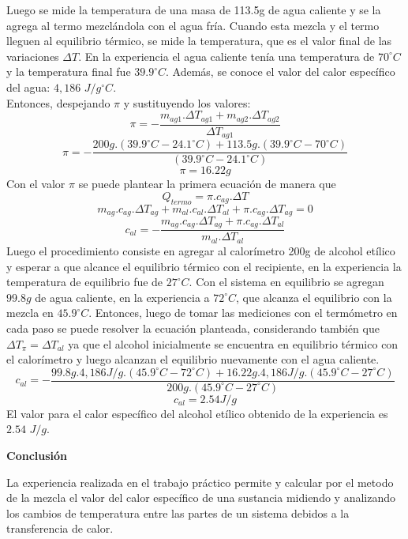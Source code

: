 \documentclass[11pt, letterpaper]{article}
\newcommand\vsp{10pt}
\newcommand\celc{^\circ C}
\begin{document}
Luego se mide la temperatura de una masa de 113.5g de agua caliente y se la agrega al 
termo mezclándola con el agua fría. Cuando esta mezcla y el termo lleguen
al equilibrio térmico, se mide la temperatura, que es el valor final de las 
variaciones $\Delta T$.
En la experiencia el agua caliente tenía una temperatura de $70 \celc$ y la 
temperatura final fue $39.9 \celc$. Además, se conoce el valor del calor
específico del agua: $4,186$ $J/{g\celc}$.\\
Entonces, despejando $\pi$ y sustituyendo los valores:\\
$$\pi = -\frac{m_{ag1}.\Delta T_{ag1} + m_{ag2}.\Delta T_{ag2}}{\Delta T_{ag1}}$$
\vspace{\vsp}
$$\pi = -\frac{200g.(39.9\celc - 24.1\celc) + 113.5g.(39.9\celc - 70\celc)}{(39.9\celc - 24.1\celc)}$$
\vspace{\vsp}
$$\pi = 16.22g$$
Con el valor $\pi$ se puede plantear la primera ecuación de manera que
$$Q_{termo} = \pi.c_{ag}.\Delta T$$
\vspace{\vsp}
$$m_{ag}.c_{ag}.\Delta T_{ag} + m_{al}.c_{al}.\Delta T_{al} + \pi.c_{ag}.\Delta T_{ag} = 0$$
\vspace{\vsp}
$$c_{al} = -\frac{m_{ag}.c_{ag}.\Delta T_{ag} + \pi.c_{ag}.\Delta T_{al}}{m_{al}.\Delta T_{al}}$$
Luego el procedimiento consiste en agregar al calorímetro 200g de alcohol etílico
y esperar a que alcance el equilibrio térmico con el recipiente, en la experiencia
la temperatura de equilibrio fue de $27\celc$. Con el sistema en equilibrio se
agregan $99.8g$ de agua caliente, en la experiencia a $72\celc$, que alcanza 
el equilibrio con la mezcla en $45.9\celc$. Entonces, luego de tomar las mediciones
con el termómetro en cada paso se puede resolver la ecuación planteada, considerando
también que $\Delta T_{\pi} = \Delta T_{al}$ ya que el alcohol inicialmente se 
encuentra en equilibrio térmico con el calorímetro y luego alcanzan el equilibrio
nuevamente con el agua caliente.
$$c_{al} = -\frac{99.8g.4,186J/g.(45.9\celc - 72\celc) + 16.22g.4,186J/g.(45.9\celc - 27\celc)}
{200g.(45.9\celc - 27\celc)}$$
\vspace{\vsp}
$$c_{al} = 2.54J/g$$
El valor para el calor específico del alcohol etílico obtenido de la experiencia
es $2.54$ $J/g$.
\pagebreak
\begin{center}\textbf{Conclusión}\end{center}
La experiencia realizada en el trabajo práctico permite y calcular
por el metodo de la mezcla el valor del calor específico de una sustancia
midiendo y analizando los cambios de temperatura entre las partes de un sistema
debidos a la transferencia de calor.
\end{document}
